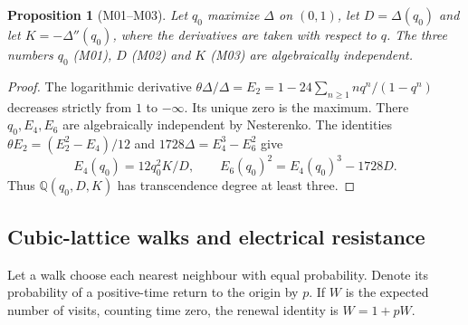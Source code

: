 \documentclass[11pt,a4paper]{article}
\newtheorem{proposition}[theorem]{Proposition}
\theoremstyle{definition}
\theoremstyle{remark}
\begin{document}
\par\hypertarget{cat-M01}{}\label{page:M01}\hypertarget{cat-M02}{}\label{page:M02}\hypertarget{cat-M03}{}\label{page:M03}
\begin{proposition}[M01--M03]
Let $q_0$ maximize $\Delta$ on $(0,1)$, let $D=\Delta(q_0)$ and let
$K=-\Delta''(q_0)$, where the derivatives are taken with respect to $q$.
The three numbers $q_0$ (M01), $D$ (M02) and $K$ (M03) are algebraically independent.
\end{proposition}
\begin{proof}
The logarithmic derivative $\theta\Delta/\Delta=E_2
=1-24\sum_{n\ge1}nq^n/(1-q^n)$ decreases strictly from $1$ to $-\infty$.
Its unique zero is the maximum. There $q_0,E_4,E_6$ are algebraically
independent by Nesterenko. The identities
$\theta E_2=(E_2^2-E_4)/12$ and $1728\Delta=E_4^3-E_6^2$ give
\[
 E_4(q_0)=12q_0^2K/D,\qquad E_6(q_0)^2=E_4(q_0)^3-1728D.
\]
Thus $\mathbb Q(q_0,D,K)$ has transcendence degree at least three.
\end{proof}

\subsection{Cubic-lattice walks and electrical resistance}

Let a walk choose each nearest neighbour with equal probability. Denote its
probability of a positive-time return to the origin by $p$. If $W$ is the expected
number of visits, counting time zero, the renewal identity is $W=1+pW$.
\end{document}
